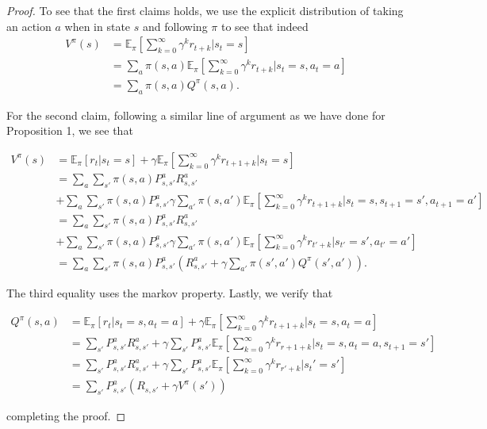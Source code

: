 \documentclass[11pt]{article} %
\begin{document}
\begin{proof}
	To see that the first claims holds, we use the explicit distribution of taking an action $a$ when in state $s$ and following $\pi$ to see that indeed
	\[
		\begin{array}{rl}
			V^{\pi}(s)		& =  \mathbb{E}_{\pi}[\sum_{k=0}^{\infty} \gamma^k r_{t+k} | s_t = s] \\
						& =  \sum_a \pi(s,a) \mathbb{E}_{\pi}[\sum_{k=0}^{\infty} \gamma^k r_{t+k} | s_t = s, a_t = a] \\
						& = \sum_a \pi(s,a) Q^{\pi}(s,a).
		\end{array}
	\]

	For the second claim, following a similar line of argument as we have done for Proposition 1, we see that

	\[
		\begin{array}{rl}
			V^{\pi}(s)		& = \mathbb{E}_{\pi}[r_t | s_t = s] + \gamma \mathbb{E}_{\pi}[\sum_{k=0}^{\infty} \gamma^k r_{t+1+k} | s_t = s] \\
						& = \sum_a \sum_{s'} \pi(s,a) P_{s,s'}^a R_{s,s'}^a \\
						& + \sum_a \sum_{s'} \pi(s,a) P_{s,s'}^a \gamma  \sum_{a'} \pi(s,a') \mathbb{E}_{\pi}[\sum_{k=0}^{\infty} \gamma^k r_{t+1+k} | s_t = s, s_{t+1} = s', a_{t+1} = a'] \\
						& = \sum_a \sum_{s'} \pi(s,a) P_{s,s'}^a R_{s,s'}^a \\
						& + \sum_a \sum_{s'} \pi(s,a) P_{s,s'}^a \gamma  \sum_{a'} \pi(s,a') \mathbb{E}_{\pi}[\sum_{k=0}^{\infty} \gamma^k r_{t'+k} | s_{t'} = s', a_{t'} = a'] \\
						& =  \sum_a \sum_{s'} \pi(s,a) P_{s,s'}^a ( R_{s,s'}^a + \gamma \sum_{a'} \pi(s',a') Q^{\pi}(s',a') ).
		\end{array}
	\]

	The third equality uses the markov property. Lastly, we verify that

	\[
		\begin{array}{rl}
			Q^{\pi}(s,a)  	& = \mathbb{E}_{\pi}[r_t | s_t = s, a_t = a] + \gamma \mathbb{E}_{\pi}[\sum_{k=0}^{\infty} \gamma^k r_{t+1+k} | s_t = s, a_t = a] \\
						& = \sum_{s'} P_{s,s'}^a R_{s,s'}^a + \gamma \sum_{s'} P_{s,s'}^a \mathbb{E}_{\pi}[\sum_{k=0}^{\infty} \gamma^k r_{r+1+k} | s_t = s, a_t = a, s_{t+1} = s'] \\
						& = \sum_{s'} P_{s,s'}^a R_{s,s'}^a + \gamma \sum_{s'} P_{s,s'}^a \mathbb{E}_{\pi}[\sum_{k=0}^{\infty} \gamma^k r_{r'+k} | s_t' = s'] \\
						& = \sum_{s'} P_{s,s'}^a ( R_{s,s'} + \gamma V^{\pi}(s') )
		\end{array}
	\]

	completing the proof.

\end{proof}
\end{document}
